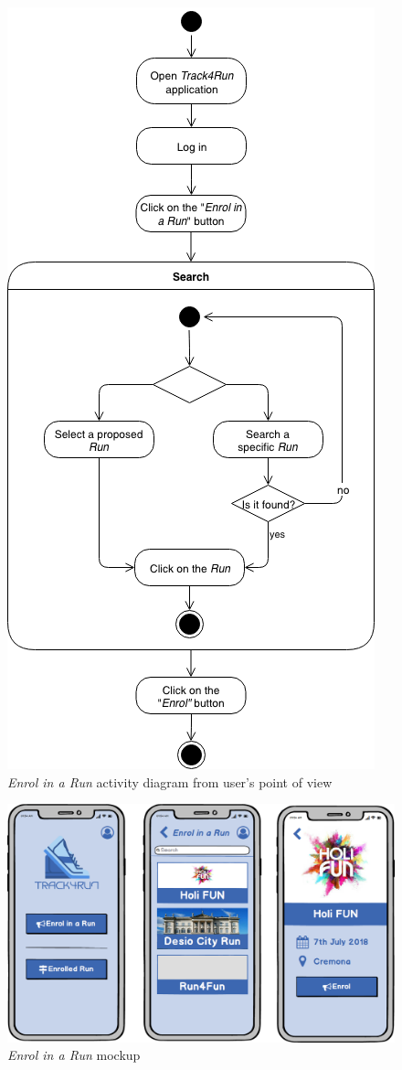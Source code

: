 \begin{figure}[H]
\begin{center}
  \includegraphics[height=0.6\paperheight]{img/activity/Enrol.png}
  \hspace{0.05\linewidth}
  \centering
  \caption{\textit{Enrol in a Run} activity diagram from user's point of view}
  \label{img:enrolInARunActivityDiagram}
\end{center}
\end{figure}

\begin{figure}[H]
\begin{center}
  \includegraphics[width=\textwidth]{img/mockup/EnrolRun.png}
  \hspace{0.05\linewidth}
  \centering
  \caption{\textit{Enrol in a Run} mockup}
  \label{img:enrolInARunMockup}
\end{center}
\end{figure}
